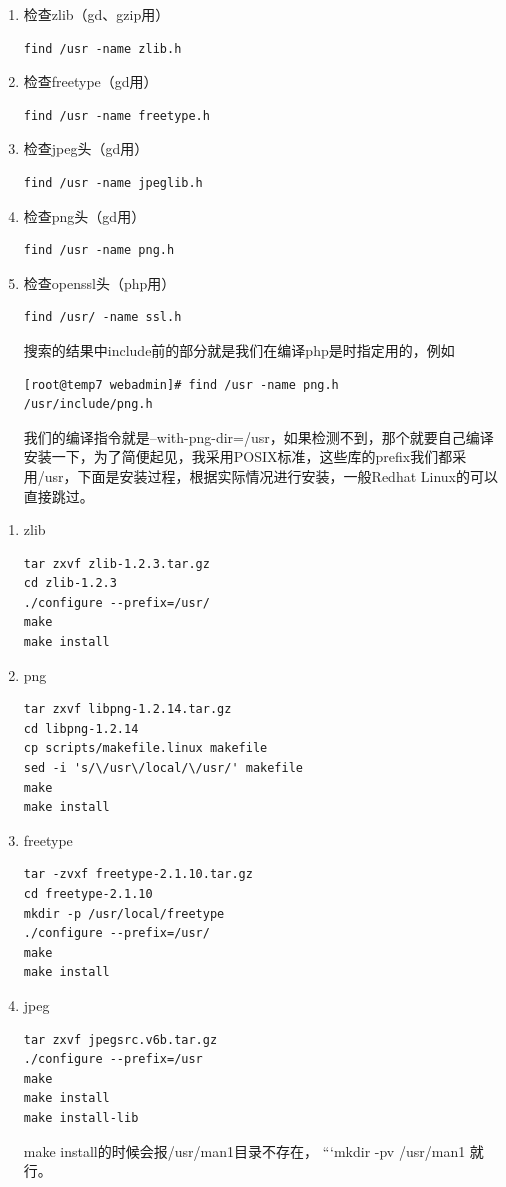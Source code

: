 \documentclass{article}
\begin{document}
\begin{enumerate}
\item 检查zlib（gd、gzip用）
\begin{verbatim}
find /usr -name zlib.h
\end{verbatim}
\item 检查freetype（gd用）
\begin{verbatim}
find /usr -name freetype.h
\end{verbatim}
\item 检查jpeg头（gd用）
\begin{verbatim}
find /usr -name jpeglib.h
\end{verbatim}
\item 检查png头（gd用）
\begin{verbatim}
find /usr -name png.h
\end{verbatim}
\item 检查openssl头（php用）
\begin{verbatim}
find /usr/ -name ssl.h
\end{verbatim}
搜索的结果中include前的部分就是我们在编译php是时指定用的，例如
\begin{verbatim}
[root@temp7 webadmin]# find /usr -name png.h
/usr/include/png.h
\end{verbatim}
我们的编译指令就是--with-png-dir=/usr，如果检测不到，那个就要自己编译安装一下，为了简便起见，我采用POSIX标准，这些库的prefix我们都采用/usr，下面是安装过程，根据实际情况进行安装，一般Redhat Linux的可以直接跳过。
\end{enumerate}

\begin{enumerate}
\item zlib
\begin{verbatim}
tar zxvf zlib-1.2.3.tar.gz
cd zlib-1.2.3
./configure --prefix=/usr/
make
make install
\end{verbatim}
\item png
\begin{verbatim}
tar zxvf libpng-1.2.14.tar.gz 
cd libpng-1.2.14 
cp scripts/makefile.linux makefile 
sed -i 's/\/usr\/local/\/usr/' makefile
make 
make install
\end{verbatim}
\item freetype
\begin{verbatim}
tar -zvxf freetype-2.1.10.tar.gz 
cd freetype-2.1.10 
mkdir -p /usr/local/freetype 
./configure --prefix=/usr/
make
make install
\end{verbatim}
\item jpeg
\begin{verbatim}
tar zxvf jpegsrc.v6b.tar.gz 
./configure --prefix=/usr 
make 
make install 
make install-lib
\end{verbatim}
make install的时候会报/usr/man1目录不存在，
```mkdir -pv /usr/man1
就行。
\end{enumerate}
\end{document}
